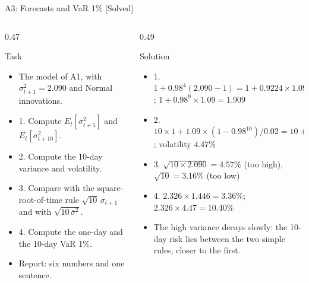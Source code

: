 \begin{frame}{A3: Forecasts and VaR 1\% [Solved]}
\itemsize{\scriptsize}
\begin{columns}[T]
\begin{column}{0.47\textwidth}
\begin{block}{Task}
\begin{itemize}
    \item The model of A1, with $\sigma_{t+1}^2 = 2.090$ and Normal innovations.
    \item 1. Compute $E_t[\sigma_{t+5}^2]$ and $E_t[\sigma_{t+10}^2]$.
    \item 2. Compute the 10-day variance and volatility.
    \item 3. Compare with the square-root-of-time rule $\sqrt{10}\,\sigma_{t+1}$ and with $\sqrt{10\,\bar\sigma^2}$.
    \item 4. Compute the one-day and the 10-day VaR 1\%.
    \item Report: six numbers and one sentence.
\end{itemize}
\end{block}
\end{column}
\begin{column}{0.49\textwidth}
\begin{exampleblock}{Solution}
\begin{itemize}
    \item 1. $1 + 0.98^{4}(2.090 - 1) = 1 + 0.9224 \times 1.09 = 2.005$; $1 + 0.98^{9} \times 1.09 = 1.909$
    \item 2. $10 \times 1 + 1.09 \times (1 - 0.98^{10})/0.02 = 10 + 1.09 \times 9.146 = 19.97$; volatility $4.47\%$
    \item 3. $\sqrt{10 \times 2.090} = 4.57\%$ (too high), $\sqrt{10} = 3.16\%$ (too low)
    \item 4. $2.326 \times 1.446 = 3.36\%$; $2.326 \times 4.47 = 10.40\%$
    \item The high variance decays slowly: the 10-day risk lies between the two simple rules, closer to the first.
\end{itemize}
\end{exampleblock}
\end{column}
\end{columns}
\end{frame}

